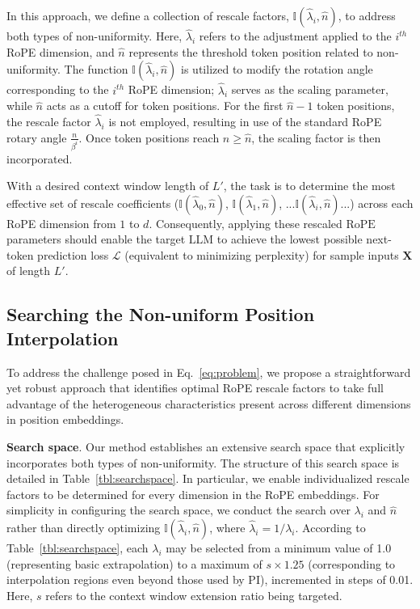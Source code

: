 In this approach, we define a collection of rescale factors, $\mathbb{I}(\hat{\lambda}_{i},\hat{n})$, to address both types of non-uniformity. Here, $\hat{\lambda}_i$ refers to the adjustment applied to the $i^{th}$ RoPE dimension, and $\hat{n}$ represents the threshold token position related to non-uniformity. The function $\mathbb{I}(\hat{\lambda}_{i},\hat{n})$ is utilized to modify the rotation angle corresponding to the $i^{th}$ RoPE dimension; $\hat{\lambda}_i$ serves as the scaling parameter, while $\hat{n}$ acts as a cutoff for token positions. For the first $\hat{n} - 1$ token positions, the rescale factor $\hat{\lambda}_i$ is not employed, resulting in use of the standard RoPE rotary angle $\frac{n}{\beta^i}$. Once token positions reach $n\ge\hat{n}$, the scaling factor is then incorporated.

With a desired context window length of $L'$, the task is to determine the most effective set of rescale coefficients ($\mathbb{I}(\hat{\lambda}_{0},\hat{n})$, $\mathbb{I}(\hat{\lambda}_{1},\hat{n})$, ...$\mathbb{I}(\hat{\lambda}_{i},\hat{n})$...) across each RoPE dimension from $1$ to $d$. Consequently, applying these rescaled $\text{RoPE}$ parameters should enable the target $\text{LLM}$ to achieve the lowest possible next-token prediction loss $\mathcal{L}$ (equivalent to minimizing perplexity) for sample inputs $\mathbf{X}$ of length $L'$.

\subsection{Searching the Non-uniform Position Interpolation}

To address the challenge posed in Eq.~\ref{eq:problem}, we propose a straightforward yet robust approach that identifies optimal RoPE rescale factors to take full advantage of the heterogeneous characteristics present across different dimensions in position embeddings.

\textbf{Search space}. Our method establishes an extensive search space that explicitly incorporates both types of non-uniformity. The structure of this search space is detailed in Table~\ref{tbl:searchspace}. In particular, we enable individualized rescale factors to be determined for every dimension in the RoPE embeddings. For simplicity in configuring the search space, we conduct the search over $\lambda_i$ and $\hat{n}$ rather than directly optimizing $\mathbb{I}(\hat{\lambda}_{i},\hat{n})$, where $\hat{\lambda}_{i}=1/\lambda_i$. According to Table~\ref{tbl:searchspace}, each $\lambda_i$ may be selected from a minimum value of 1.0 (representing basic extrapolation) to a maximum of $s\times1.25$ (corresponding to interpolation regions even beyond those used by PI), incremented in steps of 0.01. Here, $s$ refers to the context window extension ratio being targeted.

